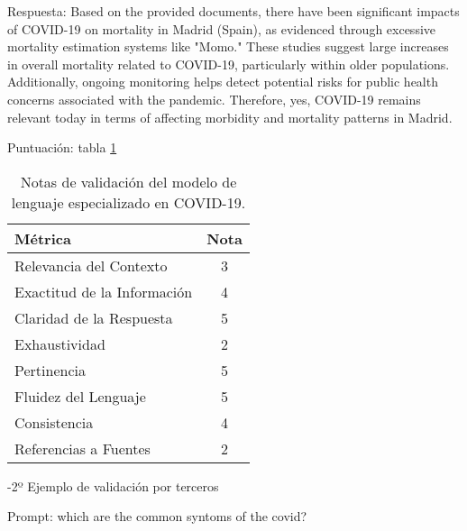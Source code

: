 Respuesta: Based on the provided documents, there have been significant impacts of COVID-19 on mortality in Madrid (Spain), as evidenced through excessive mortality estimation systems like "Momo." These studies suggest large increases in overall mortality related to COVID-19, particularly within older populations. Additionally, ongoing monitoring helps detect potential risks for public health concerns associated with the pandemic. Therefore, yes, COVID-19 remains relevant today in terms of affecting morbidity and mortality patterns in Madrid.

Puntuación: tabla \ref{tab:validation_scorest1}

\begin{table}[h]
    \centering
    \begin{adjustbox}{max width=\textwidth}
    \begin{tabular}{|l|c|}
        \hline
        \textbf{Métrica} & \textbf{Nota} \\
        \hline
        Relevancia del Contexto & 3 \\
        \hline
        Exactitud de la Información & 4 \\
        \hline
        Claridad de la Respuesta & 5 \\
        \hline
        Exhaustividad & 2 \\
        \hline
        Pertinencia & 5 \\
        \hline
        Fluidez del Lenguaje & 5 \\
        \hline
        Consistencia & 4 \\
        \hline
        Referencias a Fuentes & 2 \\
        \hline
    \end{tabular}
    \end{adjustbox}
    \caption{Notas de validación del modelo de lenguaje especializado en COVID-19.}
    \label{tab:validation_scorest1}
\end{table}


-2º Ejemplo de validación por terceros

Prompt: which are the common syntoms of the covid?


